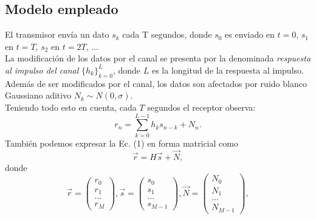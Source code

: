 \documentclass[10pt,journal,compsoc]{IEEEtran}
\begin{document}
\subsection{Modelo empleado}
El transmisor env\'ia un dato ${s_{k}}$ cada T segundos, donde ${s_0}$ es enviado en $t = 0$, ${s_1}$ en $t = T$, ${s_2}$ en $t = 2T$, ...\\
La modificaci\'on de los datos por el canal se presenta por la denominada \textit{respuesta al impulso del canal} $\{{h_{k}\}}_{k=0}^{L}$, donde $L$ es la longitud de la respuesta al impulso. \\
Adem\'as de ser modificados por el canal, los datos son afectados por ruido blanco Gaussiano aditivo ${N_k}\sim N(0, \sigma)$.\\
Teniendo todo esto en cuenta, cada $T$ segundos el receptor observa: \\
\begin{equation}
r_n = \sum_{k=0}^{L-1} {h_{k}s_{n-k}}+N_n.
\end{equation}
Tambi\'en podemos expresar la Ec. (1) en forma matricial como
\begin{equation}
\vec{r} = H\vec{s}+\vec{N},
\end{equation}
donde
\begin{equation}
\vec{r} = \left(
\begin{array}{c}
r_0\\ r_1\\ ...\\r_M
\end{array}
\right),  \vec{s}= \left(
\begin{array}{c}
s_0\\ s_1\\ ...\\s_{M-1}
\end{array}
\right), 
\vec{N}=\left(
\begin{array}{c}
N_0\\ N_1\\ ...\\N_{M-1}
\end{array}
\right),
\end{equation}
\end{document}
